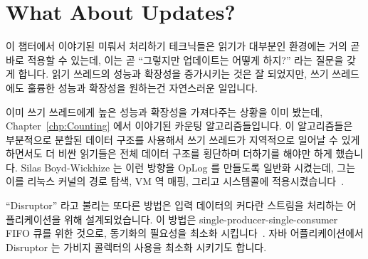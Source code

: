 
\section{What About Updates?}
\label{sec:defer:What About Updates?}

이 챕터에서 이야기된 미뤄서 처리하기 테크닉들은 읽기가 대부분인 환경에는 거의
곧바로 적용할 수 있는데, 이는 곧 ``그렇지만 업데이트는 어떻게 하지?'' 라는
질문을 갖게 합니다.
읽기 쓰레드의 성능과 확장성을 증가시키는 것은 잘 되었지만, 쓰기 쓰레드에도
훌륭한 성능과 확장성을 원하는건 자연스러운 일입니다.
\iffalse

The deferred-processing techniques called out in this chapter are most
directly applicable to read-mostly situations, which begs the question
``But what about updates?''
After all, increasing the performance and scalability of readers is all
well and good, but it is only natural to also want great performance and
scalability for writers.
\fi

이미 쓰기 쓰레드에게 높은 성능과 확장성을 가져다주는 상황을 이미 봤는데,
Chapter~\ref{chp:Counting} 에서 이야기된 카운팅 알고리즘들입니다.
이 알고리즘들은 부분적으로 분할된 데이터 구조를 사용해서 쓰기 쓰레드가
지역적으로 일어날 수 있게 하면서도 더 비싼 읽기들은 전체 데이터 구조를 횡단하며
더하기를 해야만 하게 했습니다.
Silas Boyd-Wickhize 는 이런 방향을 OpLog 를 만들도록 일반화 시켰는데, 그는 이를
리눅스 커널의 경로 탐색, VM 역 매핑, 그리고  시스템콜에
적용시켰습니다~\cite{SilasBoydWickizerPhD}.
\iffalse

We have already seen one situation featuring high performance and
scalability for writers, namely the counting algorithms surveyed in
Chapter~\ref{chp:Counting}.
These algorithms featured partially partitioned data structures so
that updates can operate locally, while the more-expensive reads
must sum across the entire data structure.
Silas Boyd-Wickhizer has generalized this notion to produce
OpLog, which he has applied to
Linux-kernel pathname lookup, VM reverse mappings, and the \co{stat()} system
call~\cite{SilasBoydWickizerPhD}.
\fi

``Disruptor'' 라고 불리는 또다른 방법은 입력 데이터의 커다란 스트림을 처리하는
어플리케이션을 위해 설계되었습니다.
이 방법은 single-producer-single-consumer FIFO 큐를 위한 것으로, 동기화의
필요성을 최소화 시킵니다~\cite{AdrianSutton2013LCA:Disruptor}.
자바 어플리케이션에서 Disruptor 는 가비지 콜렉터의 사용을 최소화 시키기도
합니다.

